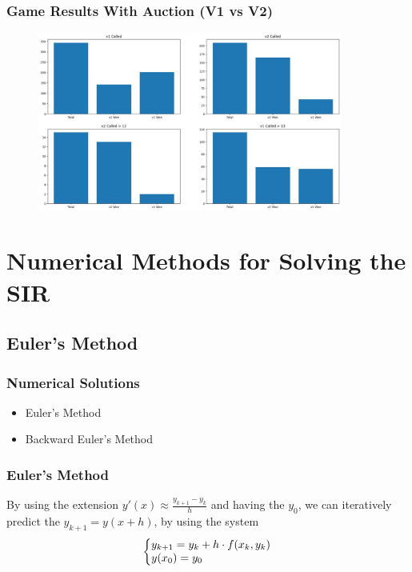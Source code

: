 \documentclass{beamer}
\makeatletter
\newenvironment{system}%
{\left\lbrace\begin{array}{@{}l@{}}}%
{\end{array}\right.}
\makeatother
\begin{document}
\begin{frame}\frametitle{Game Results With Auction (V1 vs V2)}
\begin{center}
        \begin{figure}
	    \includegraphics[width=10cm]{V1vsV2.png}
        \end{figure}
\end{center}
\end{frame}


\section{Numerical Methods for Solving the SIR}
\subsection{Euler's Method}

\begin{frame}\frametitle{Numerical Solutions}
\begin{itemize}
\item Euler's Method
\item Backward Euler's Method
\end{itemize}
\end{frame}

\begin{frame}\frametitle{Euler's Method}
    By using the extension $y'(x) \approx \frac{y_{k+1}-y_{k}}{h}$ and having the
$y_0$, we can iteratively predict the $y_{k+1}=y(x+h)$, by using the system
\vspace{1.5cm}
\large
\begin{equation*}
    \begin{system}
	    y_{k+1} = y_k + h\cdot f(x_k,y_k)
        \\
        y(x_0)=y_0
    \end{system}
\end{equation*}

\end{frame}
\end{document}
